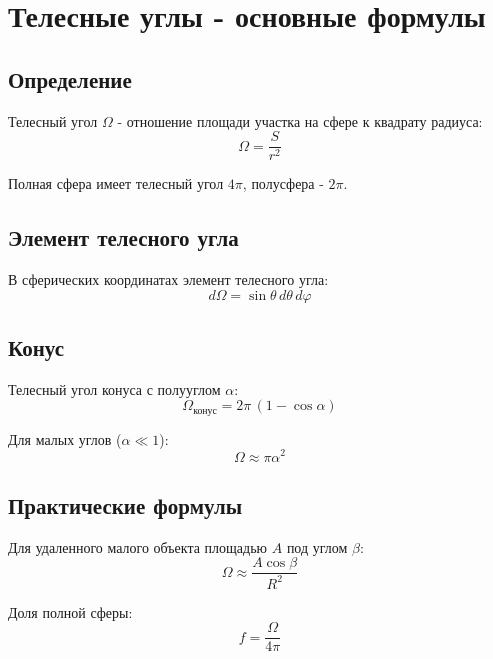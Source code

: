 \documentclass{article}
\begin{document}
\section*{Телесные углы - основные формулы}

\subsection*{Определение}
Телесный угол $\Omega$ - отношение площади участка на сфере к квадрату радиуса:
\[\Omega=\frac{S}{r^2}\]

Полная сфера имеет телесный угол $4\pi$, полусфера - $2\pi$.

\subsection*{Элемент телесного угла}
В сферических координатах элемент телесного угла:
\[d\Omega=\sin\theta\,d\theta\,d\varphi\]

\subsection*{Конус}
Телесный угол конуса с полууглом $\alpha$:
\[\Omega_{\text{конус}}=2\pi\,(1-\cos\alpha)\]

Для малых углов ($\alpha \ll 1$):
\[\Omega\approx \pi\alpha^2\]

\subsection*{Практические формулы}
Для удаленного малого объекта площадью $A$ под углом $\beta$:
\[\Omega\approx \frac{A\cos\beta}{R^2}\]

Доля полной сферы:
\[f=\frac{\Omega}{4\pi}\]
\end{document}
